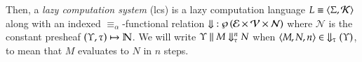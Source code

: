 \documentclass[11pt]{article}
\theoremstyle{definition}
\theoremstyle{remark}
\numberwithin{equation}{section}
\def\IModeColorName{MidnightBlue}
\def\OModeColorName{Maroon}
\def\IModeColorName{Black}
\def\OModeColorName{Black}
\newcommand\IMode[1]{{\color{\IModeColorName}{#1}}}
\newcommand\OMode[1]{{\color{\OModeColorName}{#1}}}
\newcommand\Member[2]{\IMode{#1}\in\IMode{#2}}
\newcommand\Of[2]{\IMode{#1}: \IMode{#2}}
\newcommand\Match[2]{\IMode{#1}\equiv\OMode{#2}}
\newcommand\MapsTo[2]{\IMode{#1}\mapsto\OMode{#2}}
\newcommand\CanOperators{\mathcal{K}}
\newcommand\Pair[2]{\left\langle#1, #2 \right\rangle}
\newcommand\Tuple[1]{\left\langle#1 \right\rangle}
\newcommand\Pow[1]{\wp\left(#1\right)}
\newcommand\EvalN[5]{\IMode{#1}\parallel\IMode{#4}\Downarrow^{\OMode{#3}}_{\IMode{#2}}\OMode{#5}}
\newcommand\Exprs{\mathcal{E}}
\newcommand\Values{\mathcal{V}}
\newcommand\Naturals{\mathbb{N}}
\newcommand\NaturalsPsh{\mathcal{N}}
\begin{document}
Then, a \emph{lazy computation system} (lcs) is a lazy computation language
$\Match{L}{\Pair{\Sigma}{\CanOperators}}$ along with an indexed
$\equiv_\alpha$-functional relation
$\Of{\Downarrow}{\Pow{\Exprs\times\Values\times\NaturalsPsh}}$ where
$\NaturalsPsh$ is the constant presheaf $\MapsTo{(\Upsilon, \tau)}{\Naturals}$.
We will write $\EvalN{\Upsilon}{\tau}{n}{M}{N}$ when
$\Member{\Tuple{M,N,n}}{\Downarrow_\tau(\Upsilon)}$, to mean that $M$ evaluates
to $N$ in $n$ steps.

\ifdraft{}{
  \nocite{maclane:1971}
  
  
}
\end{document}
